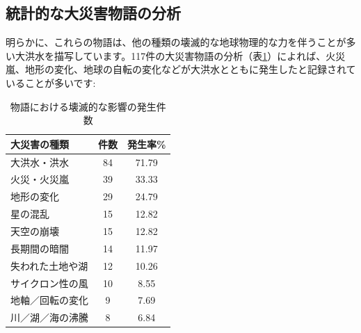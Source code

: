 \documentclass[10pt,twocolumn,letterpaper]{article}
\begin{document}
\subsection{統計的な大災害物語の分析}

明らかに、これらの物語は、他の種類の壊滅的な地球物理的な力を伴うことが多い大洪水を描写しています。117件の大災害物語の分析（表\ref{tab: 1}）によれば、火災嵐、地形の変化、地球の自転の変化などが大洪水とともに発生したと記録されていることが多いです\cite{14}:

\begin{table}[ht]
\begin{center}
\renewcommand{\arraystretch}{1.2}  %
\begin{tabular}{|l|c|c|}
\hline
\textbf{大災害の種類} & \textbf{件数} & \textbf{発生率\%} \\
\hline\hline
大洪水・洪水            & 84 & 71.79 \\
火災・火災嵐            & 39 & 33.33 \\
地形の変化              & 29 & 24.79 \\
星の混乱                & 15 & 12.82 \\
天空の崩壊              & 15 & 12.82 \\
長期間の暗闇            & 14 & 11.97 \\

失われた土地や湖 & 12 & 10.26 \\
サイクロン性の風 & 10 & 8.55  \\
地軸／回転の変化 & 9 & 7.69  \\
川／湖／海の沸騰 & 8 & 6.84 \\
\hline
\end{tabular}
\end{center}
\caption{物語における壊滅的な影響の発生件数}
\label{tab: 1}
\end{table}

\end{document}
